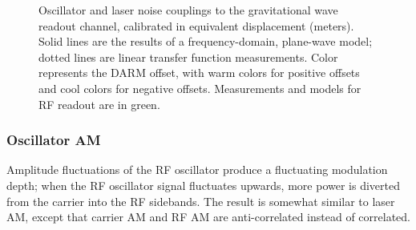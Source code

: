 \begin{figure}

\caption{\label{noise-couplings}Oscillator and laser noise couplings to the gravitational wave readout channel, calibrated in equivalent displacement (meters).  Solid lines are the results of a frequency-domain, plane-wave model; dotted lines are linear transfer function measurements.  Color represents the DARM offset, with warm colors for positive offsets and cool colors for negative offsets.  Measurements and models for RF readout are in green.}
\end{figure}

\subsubsection{Oscillator AM}

Amplitude fluctuations of the RF oscillator produce a fluctuating modulation
depth; when the RF oscillator signal fluctuates upwards, more power is diverted
from the carrier into the RF sidebands.  The result is somewhat similar to laser
AM, except that carrier AM and RF AM are anti-correlated instead of correlated.

